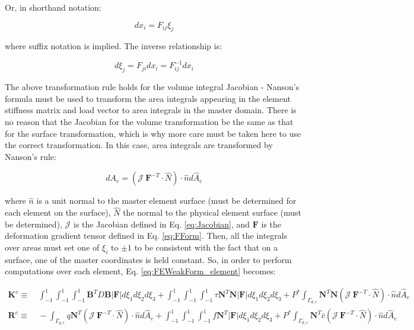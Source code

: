 \documentclass[10pt]{article}
\begin{document}
Or, in shorthand notation:

\begin{equation}
dx_i=F_{ij}\xi_j
\end{equation}

where suffix notation is implied. The inverse relationship is:

\begin{equation}
d\xi_j=F_{ji}dx_i=F_{ij}^{-1}dx_i
\end{equation}

The above transformation rule holds for the volume integral Jacobian - Nanson's formula must be used to transform the area integrals appearing in the element stiffness matrix and load vector to area integrals in the master domain. There is no reason that the Jacobian for the volume transformation be the same as that for the surface transformation, which is why more care must be taken here to use the correct transformation. In this case, area integrals are transformed by Nanson's rule:

\begin{equation}
\label{eq:Nanson}
dA_e=(\mathscr{J}\ \textbf{F}^{-T}\cdot\hat{N})\cdot\hat{n}d\hat{A}_e
\end{equation}

where \(\hat{n}\) is a unit normal to the master element surface (must be determined for each element on the surface), \(\hat{N}\) the normal to the physical element surface (must be determined), \(\mathscr{J}\) is the Jacobian defined in Eq. \eqref{eq:Jacobian}, and \(\textbf{F}\) is the deformation gradient tensor defined in Eq. \eqref{eq:FForm}. Then, all the integrals over areas must set one of \(\xi_i\) to \(\pm1\) to be consistent with the fact that on a surface, one of the master coordinates is held constant. So, in order to perform computations over each element, Eq. \eqref{eq:FEWeakForm_element} becomes:

\begin{equation}
\label{eq:FEWeakForm_element}
\begin{aligned}
\textbf{K}^e\equiv&\ \int_{-1}^{1}\int_{-1}^{1}\int_{-1}^{1}\textbf{B}^TD\textbf{B} |\textbf{F}|d\xi_1d\xi_2d\xi_3+\int_{-1}^{1}\int_{-1}^{1}\int_{-1}^{1}\tau \textbf{N}^T\textbf{N} |\textbf{F}|d\xi_1d\xi_2d\xi_3+P^{*}\int_{\Gamma_{d,e}}\textbf{N}^T\textbf{N} (\mathscr{J}\ \textbf{F}^{-T}\cdot\hat{N})\cdot\hat{n}d\hat{A}_e\\
\textbf{R}^e\equiv&\ -\int_{\Gamma_{q,e}}q\textbf{N}^T(\mathscr{J}\ \textbf{F}^{-T}\cdot\hat{N})\cdot\hat{n}d\hat{A}_e+\int_{-1}^{1}\int_{-1}^{1}\int_{-1}^{1}f\textbf{N}^T|\textbf{F}|d\xi_1d\xi_2d\xi_3+P^{*}\int_{\Gamma_{d,e}}\textbf{N}^T\bar{c}(\mathscr{J}\ \textbf{F}^{-T}\cdot\hat{N})\cdot\hat{n}d\hat{A}_e\\
\end{aligned}
\end{equation}
\end{document}
